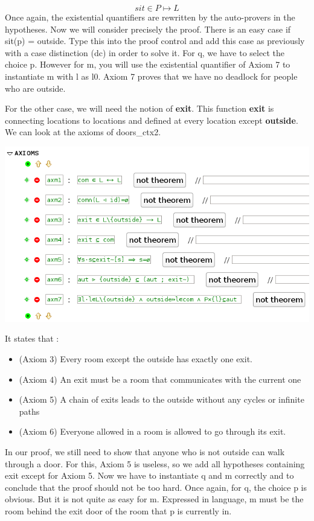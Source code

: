\[
sit \in P \mapsto L
\]
Once again, the existential quantifiers are rewritten by the auto-provers in the hypotheses. Now we will consider precisely the proof. There is an easy case if sit(p) = outside. Type this into the proof control and add this case as previously with a case distinction (dc) in order to solve it. For q, we have to select the choice p. However for m, you will use the existential quantifier of Axiom 7 to instantiate m with l as l0. 
Axiom 7 proves that we have no deadlock for people who are outside.

For the other case, we will need the notion of \textbf{exit}. This function \textbf{exit} is connecting locations to locations and defined at every location except \textbf{outside}. 
We can look at the axioms of doors\_ctx2. 
\begin{center}
	\includegraphics[]{img/tutorial/tut_10_axioms.png}
\end{center}

It states that :

\begin{itemize}
	\item (Axiom 3) Every room except the outside has exactly one exit. 
	\item (Axiom 4) An exit must be a room that communicates with the current one
	\item (Axiom 5) A chain of exits leads to the outside without any cycles or infinite paths
	\item (Axiom 6) Everyone allowed in a room is allowed to go through its exit. 
\end{itemize}  

In our proof, we still need to show that anyone who is not outside can walk through a door. For this, Axiom 5 is useless, so we add all hypotheses containing exit except for Axiom 5. Now we have to instantiate q and m correctly and to conclude that the proof should not be too hard. Once again, for q, the choice p is obvious. But it is not quite as easy for m. Expressed in language, m must be the room behind the exit door of the room that p is currently in. 

